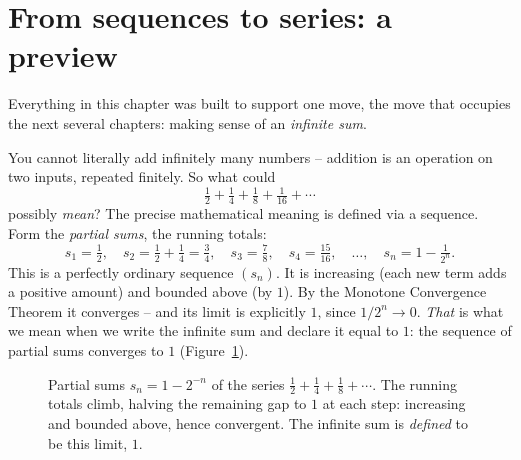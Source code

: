 \section{From sequences to series: a preview}
\label{ch28:to-series}

Everything in this chapter was built to support one move, the move that occupies
the next several chapters: making sense of an \emph{infinite sum}.

You cannot literally add infinitely many numbers -- addition is an operation on
two inputs, repeated finitely. So what could
\[
  \tfrac12 + \tfrac14 + \tfrac18 + \tfrac1{16} + \cdots
\]
possibly \emph{mean}? The precise mathematical meaning is defined via a sequence.
Form the \emph{partial sums}, the running totals:
\[
  s_1 = \tfrac12,\quad
  s_2 = \tfrac12 + \tfrac14 = \tfrac34,\quad
  s_3 = \tfrac78,\quad
  s_4 = \tfrac{15}{16},\quad \dots,\quad
  s_n = 1 - \tfrac1{2^n}.
\]
This is a perfectly ordinary sequence $(s_n)$. It is increasing (each new term
adds a positive amount) and bounded above (by $1$). By the Monotone Convergence
Theorem it converges -- and its limit is explicitly $1$, since $1/2^n \to 0$. \emph{That} is what we mean when we
write the infinite sum and declare it equal to $1$: the sequence of partial sums
converges to $1$ (Figure~\ref{ch28:fig-partialsums}).

\begin{figure}[H]
\centering
{}
\caption{Partial sums $s_n = 1 - 2^{-n}$ of the series $\tfrac12 + \tfrac14 +
\tfrac18 + \cdots$. The running totals climb, halving the remaining gap to $1$ at
each step: increasing and bounded above, hence convergent. The infinite sum is
\emph{defined} to be this limit, $1$.}
\label{ch28:fig-partialsums}
\end{figure}

